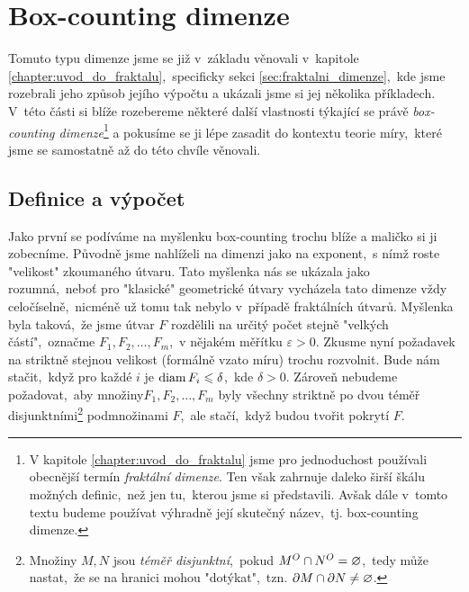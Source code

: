 \section{Box-counting dimenze}\label{sec:box-counting-dimenze}

Tomuto typu dimenze jsme se již v~základu věnovali v~kapitole \ref{chapter:uvod_do_fraktalu},~specificky sekci \ref{sec:fraktalni_dimenze},~kde jsme rozebrali jeho způsob jejího výpočtu a ukázali jsme si jej několika příkladech. V~této části si blíže rozebereme některé další vlastnosti týkající se právě \emph{box-counting dimenze}\footnote{V kapitole \ref{chapter:uvod_do_fraktalu} jsme pro jednoduchost používali obecnější termín \emph{fraktální dimenze}. Ten však zahrnuje daleko širší škálu možných definic,~než jen tu,~kterou jsme si představili. Avšak dále v~tomto textu budeme používat výhradně její skutečný název,~tj. box-counting dimenze.} a pokusíme se ji lépe zasadit do kontextu teorie míry,~které jsme se samostatně až do této chvíle věnovali.

\subsection{Definice a výpočet}\label{subsec:definice-a-vypocet-bc-dimenze}

Jako první se podíváme na myšlenku box-counting trochu blíže a maličko si ji zobecníme. Původně jsme nahlíželi na dimenzi jako na exponent,~s nímž roste "velikost" zkoumaného útvaru. Tato myšlenka nás se ukázala jako rozumná,~neboť pro "klasické" geometrické útvary vycházela tato dimenze vždy celočíselně,~nicméně už tomu tak nebylo v~případě fraktálních útvarů. Myšlenka byla taková,~že jsme útvar $F$ rozdělili na určitý počet stejně "velkých částí",~označme $F_1,F_2,\ldots,F_m$,~v nějakém měřítku $\varepsilon>0$. Zkusme nyní požadavek na striktně stejnou velikost (formálně vzato míru) trochu rozvolnit. Bude nám stačit,~když pro každé $i$ je $\operatorname{diam}{F_i}\leqslant\delta$,~kde $\delta>0$. Zároveň nebudeme požadovat,~aby množiny\linebreak{}$F_1,F_2,\ldots,F_m$ byly všechny striktně po dvou téměř disjunktními\footnote{Množiny $M,N$ jsou \emph{téměř disjunktní},~pokud $M^O\cap N^O=\varnothing$,~tedy může nastat,~že se na hranici mohou "dotýkat",~tzn. $\partial M\cap\partial N\neq\varnothing$.} podmnožinami $F$,~ale stačí,~když budou tvořit pokrytí $F$.

